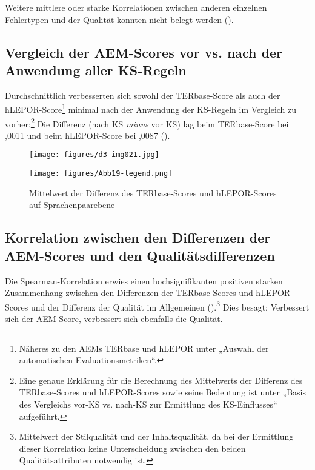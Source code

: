 Weitere mittlere oder starke Korrelationen zwischen anderen einzelnen Fehlertypen und der Qualität konnten nicht belegt werden ().

\subsection{Vergleich der AEM-Scores vor vs. nach der Anwendung aller KS-Regeln}
\label{sec:5.2.8}
Durchschnittlich verbesserten sich sowohl der TERbase-Score als auch der hLE\-POR-Score\footnote{{{{Näheres zu den AEMs TERbase und hLEPOR unter  „Auswahl der automatischen Evaluationsmetriken“.}}}} minimal nach der Anwendung der KS-Regeln im Vergleich zu vorher:\footnote{{{{Eine genaue Erklärung für die Berechnung des Mittelwerts der Differenz des TERbase-Scores und hLEPOR-Scores sowie seine Bedeutung ist unter  „Basis des Vergleichs vor-KS vs. nach-KS zur Ermittlung des KS-Einflusses“ aufgeführt.}}}} Die Differenz (nach KS \textit{minus} vor KS) lag beim TERbase-Score bei ,0011 und beim hLEPOR-Score bei ,0087 ().


\begin{figure}
\texttt{[image: figures/d3-img021.jpg]}

\texttt{[image: figures/Abb19-legend.png]}


\caption{\label{fig:05:19}Mittelwert der Differenz des TERbase-Scores und hLEPOR-Scores auf Sprachenpaarebene}
\end{figure}

\subsection{Korrelation zwischen den Differenzen der AEM-Scores und den Qualitätsdifferenzen}
\label{sec:5.2.9}
Die Spearman-Korrelation erwies einen hochsignifikanten positiven starken Zusammenhang zwischen den Differenzen der TERbase-Scores und hLEPOR-Scores und der Differenz der Qualität im Allgemeinen ().\footnote{\textrm{Mittelwert der Stilqualität und der Inhaltsqualität, da bei der Ermittlung dieser Korrelation keine Unterscheidung zwischen den beiden Qualitätsattributen notwendig ist.}} Dies besagt: Verbessert sich der AEM-Score, verbessert sich ebenfalls die Qualität.


